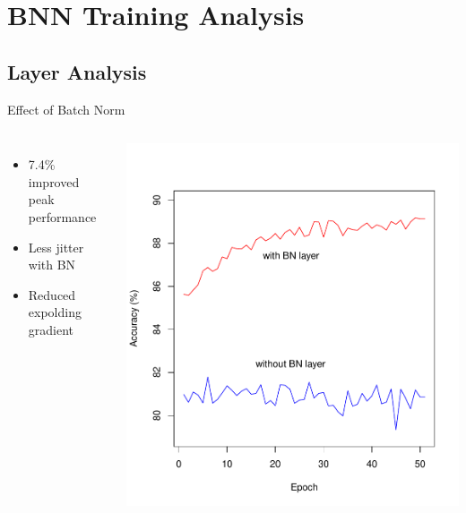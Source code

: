 \documentclass[aspectratio=1610, 12pt]{beamer}
\begin{document}
\section{BNN Training Analysis}
\begin{frame}
	\tableofcontents[currentsection]
\end{frame}
\subsection{Layer Analysis}
\begin{frame}{Effect of Batch Norm}
	\begin{columns}
		\begin{itemize}
			\item 7.4\% improved peak performance
			\item Less jitter with BN
			\item Reduced expolding gradient
		\end{itemize}

		\centering
		\includegraphics[scale=0.45]{images/batchnorm_measurement.pdf}
	\end{columns}
\end{frame}
\end{document}
